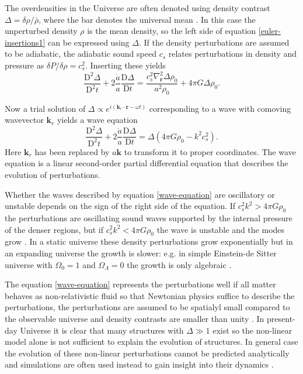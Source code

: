 \documentclass[english, oneside]{HYgradu}
\begin{document}
The overdensities in the Universe are often denoted using density contrast $\Delta = \delta\rho/\bar{\rho}$, where the bar denotes the universal mean \citep{mo2010galaxy}. In this case the unperturbed density $\rho$ is the mean density, so the left side of equation \ref{euler-insertions1} can be expressed using $\Delta$. If the density perturbations are assumed to be adiabatic, the adiabatic sound speed $c_s$ relates perturbations in density and pressure as $\delta P / \delta \rho = c_s^2$. Inserting these yields
\begin{equation}\label{euler-insertions1}
\frac{\textrm{D}^2\Delta}{\textrm{D}^2 t} + 2 \frac{\dot a}{a} \frac{\textrm{D}\Delta}{\textrm{D} t} = \frac{c_s^2 \nabla_\mathbf{r}^2 \Delta \rho_0}{a^2 \rho_0} + 4 \pi G \Delta \rho_0.
\end{equation}

Now a trial solution of $\Delta \propto e^{i(\mathbf{k}_r\cdot\mathbf{r}-\omega t)}$ corresponding to a wave with comoving wavevector $\mathbf{k}_r$ yields a wave equation
\begin{equation}\label{wave-equation}
\frac{\textrm{D}^2\Delta}{\textrm{D}^2 t} + 2 \frac{\dot a}{a} \frac{\textrm{D}\Delta}{\textrm{D} t} = \Delta(4\pi G \rho_0 - k^2c_s^2).
\end{equation}
Here $\mathbf{k}_r$ has been replaced by $a\mathbf{k}$ to transform it to proper coordinates. The wave equation is a linear second-order partial differential equation that describes the evolution of perturbations.

Whether the waves described by equation \ref{wave-equation} are oscillatory or unstable depends on the sign of the right side of the equation. If $c_s^2k^2 > 4\pi G\rho_0$ the perturbations are oscillating sound waves  supported by the internal pressure of the denser regions, but if $c_s^2k^2 < 4\pi G\rho_0$ the wave is unstable and the modes grow \citep{longair2008galaxy}. In a static universe these density perturbations grow exponentially but in an expanding universe the growth is slower: e.g. in simple Einstein-de Sitter universe with $\Omega_0 = 1$ and $\Omega_\Lambda = 0$ the growth is only algebraic \citep{longair2008galaxy}.

The equation \ref{wave-equation} represents the perturbations well if all matter behaves as non-relativistic fluid so that Newtonian physics suffice to describe the perturbations, the perturbations are assumed to be spatialyl small compared to the observable universe and density contrasts are smaller than unity \citep{mo2010galaxy}. In present-day Universe it is clear that many structures with $\Delta \gg 1$ exist so the non-linear model alone is not sufficient to explain the evolution of structures. In general case the evolution of these non-linear perturbations cannot be predicted analytically and simulations are often used instead to gain insight into their dynamics \citep{mo2010galaxy}.
\end{document}
